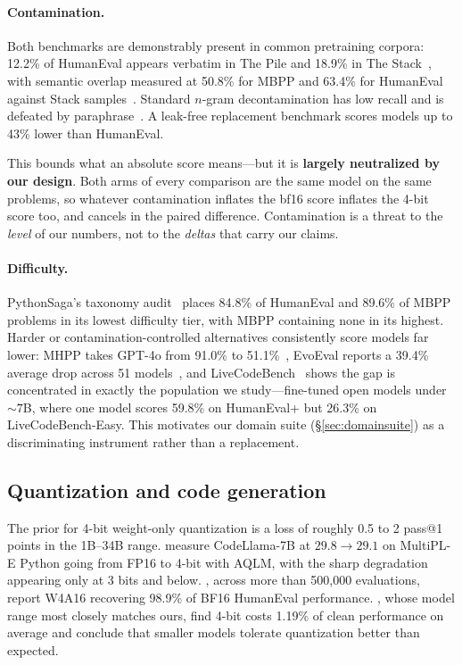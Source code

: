 \documentclass[11pt]{article}
\begin{document}
\paragraph{Contamination.} Both benchmarks are demonstrably present in common
pretraining corpora: 12.2\% of HumanEval appears verbatim in The Pile and 18.9\% in The
Stack~\citep{matton2024leakage}, with semantic overlap measured at 50.8\% for MBPP and
63.4\% for HumanEval against Stack samples~\citep{riddell2024contamination}. Standard
$n$-gram decontamination has low recall and is defeated by
paraphrase~\citep{yang2023rephrased}. A leak-free replacement benchmark scores models up
to 43\% lower than HumanEval.

This bounds what an absolute score means---but it is \textbf{largely neutralized by our
design}. Both arms of every comparison are the same model on the same problems, so
whatever contamination inflates the bf16 score inflates the 4-bit score too, and cancels
in the paired difference. Contamination is a threat to the \emph{level} of our numbers,
not to the \emph{deltas} that carry our claims.

\paragraph{Difficulty.} PythonSaga's taxonomy audit~\citep{yadav2024pythonsaga} places
84.8\% of HumanEval and 89.6\% of MBPP problems in its lowest difficulty tier, with MBPP
containing none in its highest. Harder or contamination-controlled alternatives
consistently score models far lower: MHPP takes GPT-4o from 91.0\% to
51.1\%~\citep{dai2025mhpp}, EvoEval reports a 39.4\% average drop across 51
models~\citep{xia2024evoeval}, and LiveCodeBench~\citep{jain2025livecodebench} shows the
gap is concentrated in exactly the population we study---fine-tuned open models under
${\sim}7$B, where one model scores 59.8\% on HumanEval+ but 26.3\% on
LiveCodeBench-Easy. This motivates our domain suite (\S\ref{sec:domainsuite}) as a
discriminating instrument rather than a replacement.

\subsection{Quantization and code generation}

The prior for 4-bit weight-only quantization is a loss of roughly 0.5 to 2 pass@1 points
in the 1B--34B range. \citet{giagnorio2025ptq} measure CodeLlama-7B at
$29.8 \to 29.1$ on MultiPL-E Python going from FP16 to 4-bit with AQLM, with the sharp
degradation appearing only at 3 bits and below. \citet{kurtic2025bf16}, across more than
500,000 evaluations, report W4A16 recovering 98.9\% of BF16 HumanEval performance.
\citet{fang2025smaller}, whose model range most closely matches ours, find 4-bit costs
1.19\% of clean performance on average and conclude that smaller models tolerate
quantization better than expected.
\end{document}
